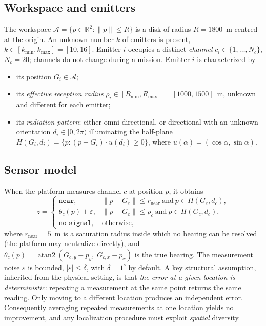 \documentclass[preprint,12pt,3p]{elsarticle}
\theoremstyle{definition}
\newcommand{\Rmin}{R_{\min}}
\newcommand{\Rmax}{R_{\max}}
\newcommand{\bA}{\mathcal{A}}
\newcommand{\R}{\mathbb{R}}
\begin{document}
\subsection{Workspace and emitters}
The workspace $\bA=\{p\in\R^2:\|p\|\le R\}$ is a disk of radius $R=1800$~m centred at the
origin. An unknown number $k$ of emitters is present, $k\in[k_{\min},k_{\max}]=[10,16]$. Emitter
$i$ occupies a distinct \emph{channel} $c_i\in\{1,\dots,N_c\}$, $N_c=20$; channels do not change
during a mission. Emitter $i$ is characterized by
\begin{itemize}
\item its position $G_i\in\bA$;
\item its \emph{effective reception radius} $\rho_i\in[\Rmin,\Rmax]=[1000,1500]$~m, unknown and
different for each emitter;
\item its \emph{radiation pattern}: either omni-directional, or directional with an unknown
orientation $d_i\in[0,2\pi)$ illuminating the half-plane
$H(G_i,d_i)=\{p:(p-G_i)\cdot u(d_i)\ge0\}$, where $u(\alpha)=(\cos\alpha,\sin\alpha)$.
\end{itemize}

\subsection{Sensor model}
\label{sec:sensor}
When the platform measures channel $c$ at position $p$, it obtains
\begin{equation}
z=\begin{cases}
\texttt{near}, & \|p-G_c\|\le r_{\mathrm{near}}\ \text{and}\ p\in H(G_c,d_c),\\
\theta_c(p)+\varepsilon, & \|p-G_c\|\le\rho_c\ \text{and}\ p\in H(G_c,d_c),\\
\texttt{no\_signal}, & \text{otherwise},
\end{cases}
\label{eq:sensor}
\end{equation}
where $r_{\mathrm{near}}=5$~m is a saturation radius inside which no bearing can be resolved
(the platform may neutralize directly), and
$\theta_c(p)=\operatorname{atan2}(G_{c,y}-p_y,\;G_{c,x}-p_x)$ is the true bearing. The measurement
noise $\varepsilon$ is bounded, $|\varepsilon|\le\delta$, with $\delta=1^\circ$ by default. A key
structural assumption, inherited from the physical setting, is that \emph{the error at a given
location is deterministic}: repeating a measurement at the same point returns the same reading.
Only moving to a different location produces an independent error. Consequently averaging
repeated measurements at one location yields no improvement, and any localization procedure must
exploit \emph{spatial} diversity.
\end{document}
